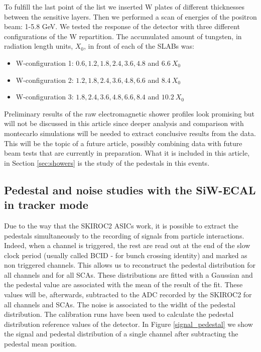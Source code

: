\documentclass[a4paper,11pt]{article}
\begin{document}
To fulfill the last point of the list we inserted W plates of different thicknesses between the 
sensitive layers. Then we performed
a scan of energies of the positron beam: 1-5.8 GeV.
We tested the response of the detector with three different configurations of the W repartition.
The accumulated amount of tungsten, in radiation length units, $X_{0}$, in front of each of the 
SLABs was:
\begin{itemize}
\item W-configuration 1: $0.6,1.2,1.8,2.4,3.6,4.8$ and $6.6~X_{0}$
\item W-configuration 2: $1.2,1.8,2.4,3.6,4.8,6.6$ and $8.4~X_{0}$
\item W-configuration 3: $1.8,2.4,3.6,4.8,6.6,8.4$ and $10.2~X_{0}$
\end{itemize}

Preliminary results of the raw electromagnetic shower profiles look promising but will not be 
discussed in this article since deeper analysis and comparison with montecarlo simulations
will be needed to extract conclusive results from the data. This will be the topic of a future 
article, possibly combining data with future beam tests that are currently in preparation. What it
is included in this article, in Section \ref{sec:showers} is the study of the pedestals in this events.


\subsection{Pedestal and noise studies with the SiW-ECAL in tracker mode}
\label{sec:pedestal}

Due to the way that the SKIROC2 ASICs work, it is possible to extract the pedestals
simultaneously to the recording of signals from particle interactions. Indeed, when a channel
is triggered, the rest are read out at the end of the slow clock period (usually called BCID - for bunch crossing identity)  and marked as
non triggered channels. This allows us to reconstruct the pedestal distribution
for all channels and for all SCAs. These distributions are fitted with a Gaussian
and the pedestal value are associated with the mean of the result of the fit.
These values will be, afterwards, subtracted to the ADC recorded by the SKIROC2 for all channels and SCAs.
The noise is associated to the widht of the pedestal distribution.
The calibration runs have been used to calculate the pedestal distribution reference values of the detector.
In Figure \ref{signal_pedestal} we show the signal and pedestal distribution of a single channel after
subtracting the pedestal mean position.
\end{document}
